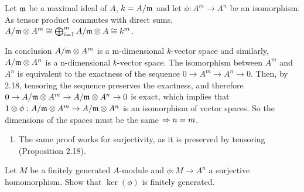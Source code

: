 \begin{sol}
	Let $\mathfrak{m}$ be a maximal ideal of $A$, $k = A/\mathfrak{m}$ and let $\phi: A^m \to A^n$ be an isomorphism. As tensor product commutes with direct sums, $A/\mathfrak{m} \otimes A^m \cong \bigoplus_{i=1}^m A/\mathfrak{m} \otimes A \cong k^m$.

	In conclusion $A/\mathfrak{m} \otimes A^m$ is a m-dimensional $k$-vector space and similarly, $A/\mathfrak{m} \otimes A^n$ is a n-dimensional $k$-vector space. The isomorphism between $A^m$ and $A^n$ is equivalent to the exactness of the sequence $0 \to A^m \to A^n \to 0$. Then, by 2.18, tensoring the sequence preserves the exactness, and therefore $0 \to A/\mathfrak{m} \otimes A^m \to A/\mathfrak{m} \otimes A^n \to 0$ is exact, which implies that $1 \otimes \phi: A/\mathfrak{m} \otimes A^m \to A/\mathfrak{m} \otimes A^n$ is an isomorphism of vector spaces. So the dimensions of the spaces must be the same $\Rightarrow n = m$.

	\begin{enumerate}[label=(\roman*)]
		\item The same proof works for surjectivity, as it is preserved by tensoring (Proposition 2.18).
	\end{enumerate}
\end{sol}

\begin{ex}
	Let $M$ be a finitely generated $A$-module and $\phi: M \to A^n$ a surjective homomorphism. Show that $\ker(\phi)$ is finitely generated.
\end{ex}

